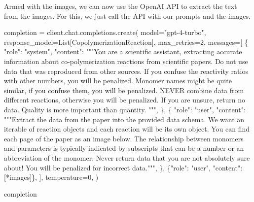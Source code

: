 \documentclass[
  letterpaper,
  DIV=11,
  numbers=noendperiod]{scrreprt}
\newenvironment{Shaded}{\begin{snugshade}}{\end{snugshade}}
\newcommand{\DecValTok}[1]{\textcolor[rgb]{0.68,0.00,0.00}{#1}}
\newcommand{\NormalTok}[1]{\textcolor[rgb]{0.00,0.23,0.31}{#1}}
\newcommand{\OperatorTok}[1]{\textcolor[rgb]{0.37,0.37,0.37}{#1}}
\newcommand{\StringTok}[1]{\textcolor[rgb]{0.13,0.47,0.30}{#1}}
\begin{document}
Armed with the images, we can now use the OpenAI API to extract the text
from the images. For this, we just call the API with our prompts and the
images.

\begin{Shaded}
\begin{Highlighting}[]
\NormalTok{completion }\OperatorTok{=}\NormalTok{ client.chat.completions.create(}
\NormalTok{    model}\OperatorTok{=}\StringTok{"gpt{-}4{-}turbo"}\NormalTok{,}
\NormalTok{    response\_model}\OperatorTok{=}\NormalTok{List[CopolymerizationReaction],}
\NormalTok{    max\_retries}\OperatorTok{=}\DecValTok{2}\NormalTok{,}
\NormalTok{    messages}\OperatorTok{=}\NormalTok{[}
\NormalTok{        \{}
            \StringTok{"role"}\NormalTok{: }\StringTok{"system"}\NormalTok{,}
            \StringTok{"content"}\NormalTok{: }\StringTok{"""You are a scientific assistant, extracting accurate information about co{-}polymerization reactions from scientific papers.}
\StringTok{Do not use data that was reproduced from other sources.}
\StringTok{If you confuse the reactivity ratios with other numbers, you will be penalized.}
\StringTok{Monomer names might be quite similar, if you confuse them, you will be penalized.}
\StringTok{NEVER combine data from different reactions, otherwise you will be penalized.}
\StringTok{If you are unsure, return no data. Quality is more important than quantity.}
\StringTok{"""}\NormalTok{,}
\NormalTok{        \},}
\NormalTok{        \{}
            \StringTok{"role"}\NormalTok{: }\StringTok{"user"}\NormalTok{,}
            \StringTok{"content"}\NormalTok{: }\StringTok{"""Extract the data from the paper into the provided data schema. We want an iterable of reaction objects and each reaction will be its own object. You can find each page of the paper as an image below.}
\StringTok{The relationship between monomers and parameters is typically indicated by subscripts that can be a number or an abbreviation of the monomer.}
\StringTok{Never return data that you are not absolutely sure about! You will be penalized for incorrect data."""}\NormalTok{,}
\NormalTok{        \},}
\NormalTok{        \{}\StringTok{"role"}\NormalTok{: }\StringTok{"user"}\NormalTok{, }\StringTok{"content"}\NormalTok{: [}\OperatorTok{*}\NormalTok{images]\},}
\NormalTok{    ],}
\NormalTok{    temperature}\OperatorTok{=}\DecValTok{0}\NormalTok{,}
\NormalTok{)}
\end{Highlighting}
\end{Shaded}

\begin{Shaded}
\begin{Highlighting}[]
\NormalTok{completion}
\end{Highlighting}
\end{Shaded}
\end{document}
